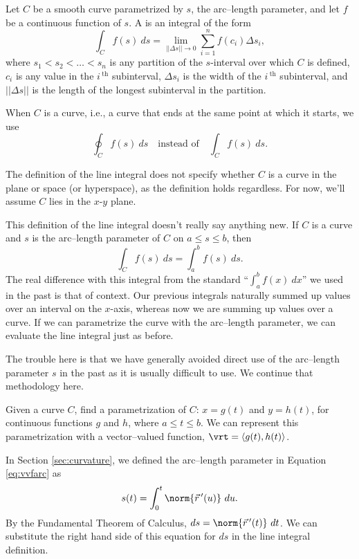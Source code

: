 {Let $C$ be a smooth curve parametrized by $s$, the arc--length parameter, and let $f$ be a continuous function of $s$. A  is an integral of the form
$$\int_C f(s)\ ds = \lim_{||\Delta s||\to 0}\sum_{i=1}^n f(c_i)\Delta s_i,$$
where $s_1<s_2<\ldots<s_n$ is any partition of the $s$-interval over which $C$ is defined, $c_i$ is any value in the $i\,^\text{th}$ subinterval,  $\Delta s_i$ is the width of the $i\,^\text{th}$ subinterval, and $||\Delta s||$ is the length of the longest subinterval in the partition.
}




When $C$ is a  curve, i.e., a curve that ends at the same point at which it starts,  we use $$\oint_C f(s)\ ds \quad \text{instead of}\quad \int_Cf(s)\ ds.$$

The definition of the line integral does not specify whether $C$ is a curve in the plane or space (or hyperspace), as the definition holds regardless. For now, we'll assume $C$ lies in the $x$-$y$ plane.

This definition of the line integral  doesn't really say anything new. If $C$ is a curve and $s$ is the arc--length parameter of $C$ on $a\leq s\leq b$, then 
$$\int_Cf(s)\ ds = \int_a^bf(s)\ ds.$$
The real difference with this integral from the standard ``$\int_a^bf(x)\ dx$'' we used in the past is that of context. Our previous integrals naturally summed up values over an interval on the $x$-axis, whereas now we are summing up values over a curve. If we can parametrize the curve with the arc--length parameter, we can evaluate the line integral just as before.

The trouble here is that we have generally avoided direct use of the arc--length parameter $s$ in the past as it is usually difficult to use. We continue that methodology here. 

Given a curve $C$, find a parametrization of $C$: $x = g(t)$ and $y=h(t)$, for continuous functions $g$ and $h$, where $a\leq t\leq b$. We can represent this parametrization with a vector--valued function, $\vrt = \langle g(t),h(t)\rangle$.

In Section \ref{sec:curvature}, we defined the arc--length parameter in Equation \ref{eq:vvfarc} as 
$$
s(t) = \int_0^t \norm{\vec r\,'(u)}\ du. 
$$
By the Fundamental Theorem of Calculus, $ds = \norm{\vec r\,'(t)}\ dt$. We can substitute the right hand side of this equation for $ds$ in the line integral definition.

